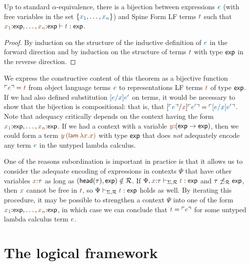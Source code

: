 \bigskip
\begin{theorem}\label{thm:expadequacy}
  Up to standard $\alpha$-equivalence, there is a bijection between
  expressions $\obj{e}$ (with free variables in the set
  $\{\obj{x_1},\ldots,\obj{x_n}\}$) and Spine Form LF terms $\lf{t}$ such
  that $\lf{x_1}{:}\mathsf{exp}, \ldots, \lf{x_n}{:}\mathsf{exp} \vdash
  \lf{t} : \mathsf{exp}$. 
\end{theorem}

\begin{proof}
By induction on the structure of the inductive definition of $\obj{e}$
in the forward direction and by induction on the structure of 
terms $\lf{t}$ with type ${\sf exp}$ in the reverse direction.
\end{proof}

We express the constructive content of this theorem as a bijective
function $\interp{e} = \lf{t}$ from object language terms $\obj{e}$ to
representations LF terms $\lf{t}$ of type ${\sf exp}$. If we had also
defined substitution $\obj{[e/x]e'}$ on terms, it would be necessary
to show that the bijection is compositional: that is, that
$[\interp{e}/\lf{x}]\interp{e'} = \interp{[e/x]e'}$.  Note that
adequacy critically depends on the context having the form
$\lf{x_1}{:}{\sf exp},\ldots,\lf{x_n}{:}{\sf exp}$. If we had a
context with a variable $\lf{y}{:}({\sf exp} \rightarrow {\sf exp})$,
then we could form a term $\lf{y\,({\sf lam}\,\lambda x. x)}$ with
type ${\sf exp}$ that does {\it not} adequately encode any term
$\obj{e}$ in the untyped lambda calculus.

One of the reasons subordination is important in practice is that it
allows us to consider the adequate encoding of expressions in contexts
$\Psi$ that have other variables $\lf{x}{:}\tau$ as long as $({\sf
  head}(\tau),{\sf exp}) \notin \mathcal R$. If $\Psi,\lf{x}{:}\tau
\vdash_{\Sigma,\subord} \lf{t} : {\sf exp}$ and $\tau
\not\preceq_\mathcal R {\sf exp}$, then $\lf{x}$ cannot be free in
$\lf{t}$, so $\Psi \vdash_{\Sigma,\subord} \lf{t} : {\sf exp}$ holds as
well. By iterating this procedure, it may be possible to strengthen a
context $\Psi$ into one of the form $\lf{x_1}{:}{\sf
  exp},\ldots,\lf{x_n}{:}{\sf exp}$, in which case we can conclude
that $\lf t = \interp{e}$ for some untyped lambda calculus term $\obj
e$.



\section{The logical framework \sls}
\label{sec:slsframework}

